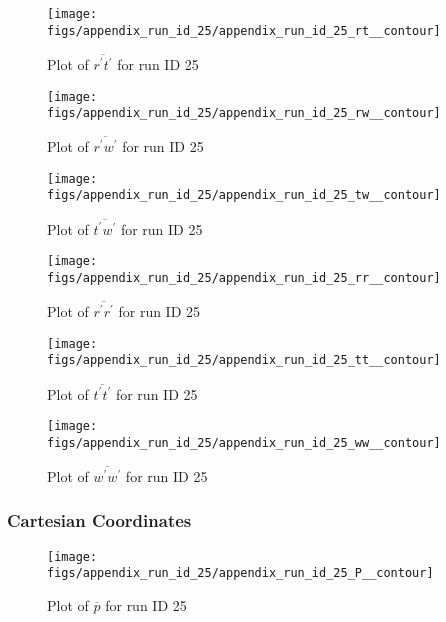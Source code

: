 \begin{figure}[H]
\centering
\texttt{[image: figs/appendix\_run\_id\_25/appendix\_run\_id\_25\_rt\_\_contour]}
\caption{Plot of $\overline{r^\prime t^\prime}$ for run ID 25}
\label{fig:appendix_run_id_25_rt__contour}
\end{figure}


\begin{figure}[H]
\centering
\texttt{[image: figs/appendix\_run\_id\_25/appendix\_run\_id\_25\_rw\_\_contour]}
\caption{Plot of $\overline{r^\prime w^\prime}$ for run ID 25}
\label{fig:appendix_run_id_25_rw__contour}
\end{figure}


\begin{figure}[H]
\centering
\texttt{[image: figs/appendix\_run\_id\_25/appendix\_run\_id\_25\_tw\_\_contour]}
\caption{Plot of $\overline{t^\prime w^\prime}$ for run ID 25}
\label{fig:appendix_run_id_25_tw__contour}
\end{figure}


\begin{figure}[H]
\centering
\texttt{[image: figs/appendix\_run\_id\_25/appendix\_run\_id\_25\_rr\_\_contour]}
\caption{Plot of $\overline{r^\prime r^\prime}$ for run ID 25}
\label{fig:appendix_run_id_25_rr__contour}
\end{figure}


\begin{figure}[H]
\centering
\texttt{[image: figs/appendix\_run\_id\_25/appendix\_run\_id\_25\_tt\_\_contour]}
\caption{Plot of $\overline{t^\prime t^\prime}$ for run ID 25}
\label{fig:appendix_run_id_25_tt__contour}
\end{figure}


\begin{figure}[H]
\centering
\texttt{[image: figs/appendix\_run\_id\_25/appendix\_run\_id\_25\_ww\_\_contour]}
\caption{Plot of $\overline{w^\prime w^\prime}$ for run ID 25}
\label{fig:appendix_run_id_25_ww__contour}
\end{figure}


\subsubsection{Cartesian Coordinates}
\begin{figure}[H]
\centering
\texttt{[image: figs/appendix\_run\_id\_25/appendix\_run\_id\_25\_P\_\_contour]}
\caption{Plot of $\overline{p}$ for run ID 25}
\label{fig:appendix_run_id_25_P__contour}
\end{figure}


